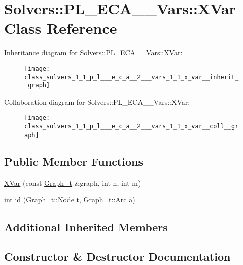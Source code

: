 \hypertarget{class_solvers_1_1_p_l___e_c_a__2___vars_1_1_x_var}{}\section{Solvers\+:\+:P\+L\+\_\+\+E\+C\+A\+\_\+\_\+\+Vars\+:\+:X\+Var Class Reference}
\label{class_solvers_1_1_p_l___e_c_a__2___vars_1_1_x_var}


Inheritance diagram for Solvers\+:\+:P\+L\+\_\+\+E\+C\+A\+\_\+\_\+\+Vars\+:\+:X\+Var\+:\nopagebreak
\begin{figure}[H]
\begin{center}
\leavevmode
\texttt{[image: class\_solvers\_1\_1\_p\_l\_\_\_e\_c\_a\_\_2\_\_\_vars\_1\_1\_x\_var\_\_inherit\_\_graph]}
\end{center}
\end{figure}


Collaboration diagram for Solvers\+:\+:P\+L\+\_\+\+E\+C\+A\+\_\+\_\+\+Vars\+:\+:X\+Var\+:\nopagebreak
\begin{figure}[H]
\begin{center}
\leavevmode
\texttt{[image: class\_solvers\_1\_1\_p\_l\_\_\_e\_c\_a\_\_2\_\_\_vars\_1\_1\_x\_var\_\_coll\_\_graph]}
\end{center}
\end{figure}
\subsection*{Public Member Functions}
\begin{DoxyCompactItemize}
\item 
\hyperlink{class_solvers_1_1_p_l___e_c_a__2___vars_1_1_x_var_ae5ad29caddc832834f540a4ff24680fd}{X\+Var} (const \hyperlink{pl__reff_8cpp_a65aea14f39d53b24df9910d54216d620}{Graph\+\_\+t} \&graph, int n, int m)
\item 
int \hyperlink{class_solvers_1_1_p_l___e_c_a__2___vars_1_1_x_var_a8fd7e459e708180210c32e3e53f8f190}{id} (Graph\+\_\+t\+::\+Node t, Graph\+\_\+t\+::\+Arc a)
\end{DoxyCompactItemize}
\subsection*{Additional Inherited Members}


\subsection{Constructor \& Destructor Documentation}
\mbox{\label{class_solvers_1_1_p_l___e_c_a__2___vars_1_1_x_var_ae5ad29caddc832834f540a4ff24680fd}} 
